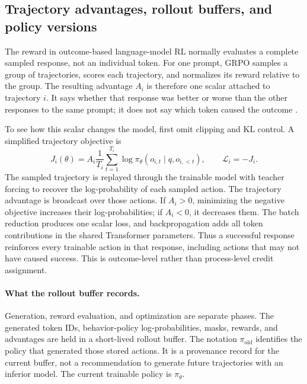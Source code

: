 \subsection{Trajectory advantages, rollout buffers, and policy versions}

The reward in outcome-based language-model RL normally evaluates a complete sampled
response, not an individual token. For one prompt, GRPO samples a group of trajectories,
scores each trajectory, and normalizes its reward relative to the group. The resulting
advantage $A_i$ is therefore one scalar attached to trajectory $i$. It says whether that
response was better or worse than the other responses to the same prompt; it does not say
which token caused the outcome \citep{guo2025deepseekr1}.

To see how this scalar changes the model, first omit clipping and KL control. A simplified
trajectory objective is
\begin{equation}
  J_i(\theta)
  = A_i\frac{1}{T_i}\sum_{t=1}^{T_i}
    \log \pi_\theta(o_{i,t}\mid q,o_{i,<t}),
  \qquad \mathcal{L}_i=-J_i.
  \label{eq:trajectory-advantage-objective}
\end{equation}
The sampled trajectory is replayed through the trainable model with teacher forcing to
recover the log-probability of each sampled action. The trajectory advantage is broadcast
over those actions. If $A_i>0$, minimizing the negative objective increases their
log-probabilities; if $A_i<0$, it decreases them. The batch reduction produces one scalar
loss, and backpropagation adds all token contributions in the shared Transformer
parameters. Thus a successful response reinforces every trainable action in that response,
including actions that may not have caused success. This is outcome-level rather than
process-level credit assignment.

\paragraph{What the rollout buffer records.}
Generation, reward evaluation, and optimization are separate phases. The generated token
IDs, behavior-policy log-probabilities, masks, rewards, and advantages are held in a
short-lived rollout buffer. The notation $\pi_{\mathrm{old}}$ identifies the policy that
generated those stored actions. It is a provenance record for the current buffer, not a
recommendation to generate future trajectories with an inferior model. The current
trainable policy is $\pi_\theta$.

